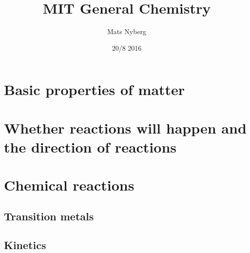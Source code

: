 \documentclass[
  fontsize=9.5pt,
  twoside,
  open=right,
  mpinclude=true,
  numbers=noenddot,
  DIV=9
]{scrbook}
\begin{document}


\title{MIT General Chemistry}
\date{20/8 2016}
\author{Mats Nyberg}
\maketitle

\frontmatter

\tableofcontents
\clearpage

\mainmatter

\part{Basic properties of matter}





\part{Whether reactions will happen and the direction of reactions}




\part{Chemical reactions}




\chapter{Transition metals}
\chapter{Kinetics}


\backmatter


\printbibliography
\end{document}
